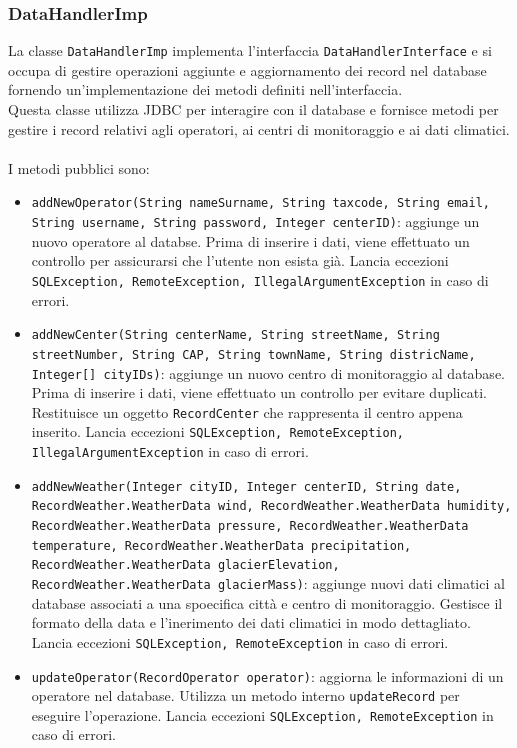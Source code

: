 \subsubsection{DataHandlerImp}
La classe \texttt{DataHandlerImp} implementa l'interfaccia \texttt{DataHandlerInterface} e si occupa di gestire operazioni aggiunte e aggiornamento dei record nel database
fornendo un'implementazione dei metodi definiti nell'interfaccia.\\
Questa classe utilizza JDBC per interagire con il database e fornisce metodi per gestire i record relativi agli operatori, ai centri di monitoraggio e ai dati climatici.\\
\\
I metodi pubblici sono:
\begin{itemize}
      \item \texttt{addNewOperator(String nameSurname, String taxcode, String email, String username, String password, Integer centerID)}:
            aggiunge un nuovo operatore al databse. Prima di inserire i dati, viene effettuato un controllo per assicurarsi che l'utente non esista già.
            Lancia eccezioni \texttt{SQLException, RemoteException, IllegalArgumentException} in caso di errori.
      \item \texttt{addNewCenter(String centerName, String streetName, String streetNumber, String CAP, String townName, String districName, Integer[] cityIDs)}:
            aggiunge un nuovo centro di monitoraggio al database. Prima di inserire i dati, viene effettuato un controllo per evitare duplicati. Restituisce un oggetto \texttt{RecordCenter} che rappresenta il centro appena inserito.
            Lancia eccezioni \texttt{SQLException, RemoteException, IllegalArgumentException} in caso di errori.
      \item \texttt{addNewWeather(Integer cityID, Integer centerID, String date, RecordWeather.WeatherData wind, RecordWeather.WeatherData humidity, RecordWeather.WeatherData pressure, RecordWeather.WeatherData temperature, RecordWeather.WeatherData precipitation, RecordWeather.WeatherData glacierElevation, RecordWeather.WeatherData glacierMass)}:
            aggiunge nuovi dati climatici al database associati a una spoecifica città e centro di monitoraggio. Gestisce il formato della data e l'inerimento dei dati climatici in modo dettagliato.
            Lancia eccezioni \texttt{SQLException, RemoteException} in caso di errori.
      \item \texttt{updateOperator(RecordOperator operator)}:
            aggiorna le informazioni di un operatore nel database. Utilizza un metodo interno \texttt{updateRecord} per eseguire l'operazione.
            Lancia eccezioni \texttt{SQLException, RemoteException} in caso di errori.
\end{itemize}
